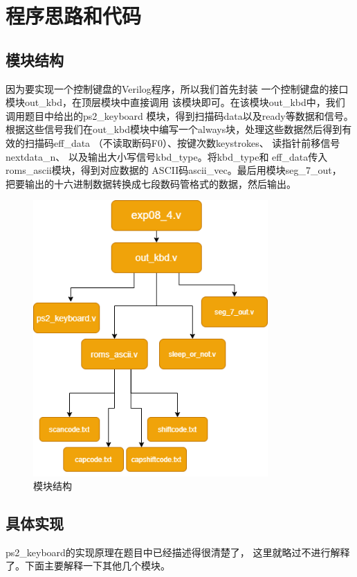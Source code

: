 \documentclass[12pt,a4paper,UTF8]{article}
\begin{document}
\section{程序思路和代码}
\subsection{模块结构}
\label{bsec:struct}
因为要实现一个控制键盘的Verilog程序，所以我们首先封装
一个控制键盘的接口模块\mbox{out\_kbd}，在顶层模块中直接调用
该模块即可。在该模块\linebreak[4]
\mbox{out\_kbd}中，我们调用题目中给出的\mbox{ps2\_keyboard}
模块，得到扫描码data以及ready等数据和信号。
根据这些信号我们在\mbox{out\_kbd}模块中编写一个always\linebreak[4]
块，处理这些数据然后得到有效的扫描码\mbox{eff\_data}
（不读取断码F0）、按键次数keystrokes、
读指针前移信号\mbox{nextdata\_n}、
以及输出大小写信号\mbox{kbd\_type}。将\mbox{kbd\_type}和
\mbox{eff\_data}传入\mbox{roms\_ascii}模块，得到对应数据的
ASCII码\mbox{ascii\_vec}。最后用模块\mbox{seg\_7\_out}，
把要输出的十六进制数据转换成七段数码管格式的数据，然后输出。

\begin{figure}[H]
  \centering
  \includegraphics[width=0.8\textwidth]{code_struct.PNG}
  \caption{模块结构}
  \label{struct}
\end{figure}

\subsection{具体实现}
\mbox{ps2\_keyboard}的实现原理在题目中已经描述得很清楚了，
这里就略过不进行解释了。下面主要解释一下其他几个模块。
\end{document}
